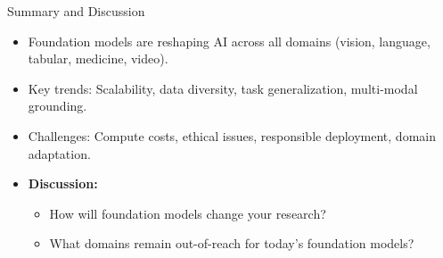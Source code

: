 \begin{frame}{Summary and Discussion}
  \begin{itemize}
    \item Foundation models are reshaping AI across all domains (vision, language, tabular, medicine, video).
    \item Key trends: Scalability, data diversity, task generalization, multi-modal grounding.
    \item Challenges: Compute costs, ethical issues, responsible deployment, domain adaptation.
    \item \textbf{Discussion:}
      \begin{itemize}
        \item How will foundation models change your research?
        \item What domains remain out-of-reach for today's foundation models?
      \end{itemize}
  \end{itemize}
\end{frame}
